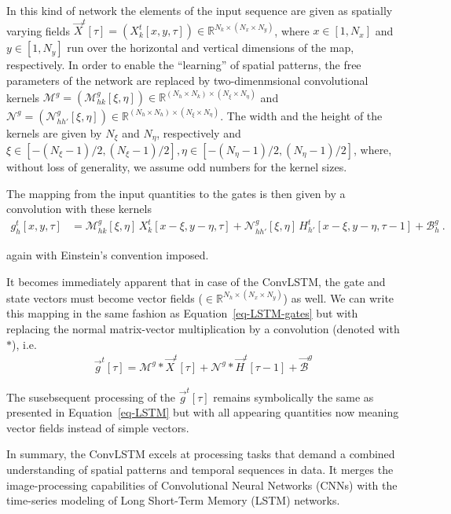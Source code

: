 \documentclass[
]{agujournal2019}
\begin{document}
In this kind of network the elements of the input sequence are given as
spatially varying fields
\(\vec{X}^t[\tau] = (X^t_k[x,y,\tau]) \in \mathbb{R}^{N_k \times (N_x \times N_y)}\),
where \(x\in[1, N_x]\) and \(y \in [1, N_y]\) run over the horizontal
and vertical dimensions of the map, respectively. In order to enable the
``learning'' of spatial patterns, the free parameters of the network are
replaced by two-dimenmsional convolutional kernels
\(\pmb{\mathcal{M}}^{g} = (\mathcal{M}^{g}_{hk}[\xi, \eta]) \in \mathbb{R}^{(N_h \times N_k)\times (N_\xi \times N_\eta)}\)
and
\(\pmb{\mathcal{N}}^{g} = (\mathcal{N}^{g}_{hh'}[\xi, \eta]) \in \mathbb{R}^{(N_h \times N_h)\times (N_\xi \times N_\eta)}\).
The width and the height of the kernels are given by \(N_\xi\) and
\(N_\eta\), respectively and
\(\xi\in [-(N_\xi-1)/2,(N_\xi-1)/2], \eta\in [-(N_\eta-1)/2,(N_\eta-1)/2]\),
where, without loss of generality, we assume odd numbers for the kernel
sizes.

The mapping from the input quantities to the gates is then given by a
convolution with these kernels \[
\begin{aligned}
g^t_h[x,y,\tau] & =  \mathcal{M}^{g}_{hk} [\xi,\eta]\, X^t_k[x-\xi, y-\eta, \tau]  +  \mathcal{N}^{g}_{hh'}[\xi,\eta] \, H^t_{h'}[x-\xi, y-\eta, \tau-1] + \mathcal{B}^g_{h}\ .
\end{aligned}
\]

again with Einstein's convention imposed.

It becomes immediately apparent that in case of the ConvLSTM, the gate
and state vectors must become vector fields
(\(\in \mathbb{R}^{N_h \times (N_x \times N_y)}\)) as well. We can write
this mapping in the same fashion as Equation~\ref{eq-LSTM-gates} but
with replacing the normal matrix-vector multiplication by a convolution
(denoted with \(\ast\)), i.e.\\
\[
\begin{aligned}
\vec{g}^t[\tau] = \pmb{\mathcal{M}}^{g} \ast \vec{X}^t[\tau] + \pmb{\mathcal{N}}^{g} \ast  \vec{H}^t[ \tau-1]+ \vec{\mathcal{B}}^g \,
\end{aligned}
\]

The susebsequent processing of the \(\vec{g}^t[\tau]\) remains
symbolically the same as presented in Equation~\ref{eq-LSTM} but with
all appearing quantities now meaning vector fields instead of simple
vectors.

In summary, the ConvLSTM excels at processing tasks that demand a
combined understanding of spatial patterns and temporal sequences in
data. It merges the image-processing capabilities of Convolutional
Neural Networks (CNNs) with the time-series modeling of Long Short-Term
Memory (LSTM) networks.
\end{document}
